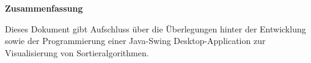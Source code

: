 \begin{center}
\textbf{\large Zusammenfassung}
\end{center}

Dieses Dokument gibt Aufschluss über die Überlegungen hinter
der Entwicklung sowie der Programmierung einer Java-Swing Desktop-Application 
zur Visualisierung von Sortieralgorithmen.

\vspace{1cm}
